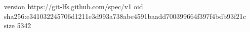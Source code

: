 version https://git-lfs.github.com/spec/v1
oid sha256:e341032245706d1211e3d993a738abe4591baadd700399664f397f4bdb93f21c
size 5342
